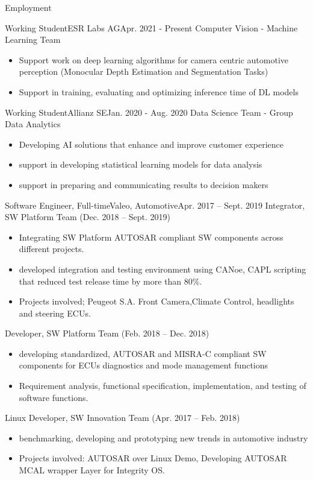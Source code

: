 \documentclass[]{mcdowellcv}
\begin{document}
	\begin{cvsection}{Employment}
		\begin{cvsubsection}{Working Student}{ESR Labs AG}{Apr. 2021 - Present}
			Computer Vision - Machine Learning Team			
			\begin{itemize}
				\item Support work on deep learning algorithms for camera centric automotive perception (Monocular Depth Estimation and Segmentation Tasks)
				\item Support in training, evaluating and optimizing inference time of DL models 
			\end{itemize}
		\end{cvsubsection}
		\begin{cvsubsection}{Working Student}{Allianz SE}{Jan. 2020 -  Aug. 2020}
			Data Science Team - Group Data Analytics
			\begin{itemize}
				\item Developing AI solutions that enhance and improve customer experience
				\item support in developing statistical learning models for data analysis
				\item support in preparing and communicating results to decision makers
			\end{itemize}
		\end{cvsubsection}
		
		\begin{cvsubsection}{Software Engineer, Full-time}{Valeo, Automotive}{Apr. 2017 -- Sept. 2019}	
			Integrator, SW Platform Team (Dec. 2018 -- Sept. 2019)
			\begin{itemize}
				\item Integrating SW Platform AUTOSAR compliant SW components across different projects.
				\item developed integration and testing environment using CANoe, CAPL scripting that reduced test release time by more than 80\%.
				\item Projects involved; Peugeot S.A. Front Camera,Climate Control, headlights and steering ECUs.
			\end{itemize}
			Developer, SW Platform Team (Feb. 2018 -- Dec. 2018)
			\begin{itemize}
				\item developing standardized, AUTOSAR and MISRA-C compliant SW components for ECUs diagnostics and mode management functions
				\item Requirement analysis, functional specification, implementation, and testing of software functions.
			\end{itemize}
			Linux Developer, SW Innovation Team (Apr. 2017 -- Feb. 2018)
			\begin{itemize}
				\item benchmarking, developing and prototyping new trends in automotive industry 
				\item Projects involved: AUTOSAR over Linux Demo, Developing AUTOSAR MCAL wrapper Layer for Integrity OS.
			\end{itemize}
			

\end{cvsubsection}
\end{cvsection}
\end{document}

